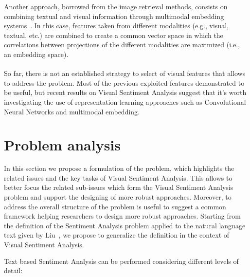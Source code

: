 Another approach, borrowed from the image retrieval methods, consists on combining textual and visual information through multimodal embedding systems~\cite{katsurai2016image}. In this case, features taken from different modalities (e.g., visual, textual, etc.) are combined to create a common vector space in which the correlations between projections of the different modalities are maximized (i.e., an embedding space).
\\
\\
So far, there is not an established strategy to select of visual features that allows to  address the problem. Most of the previous exploited features demonstrated to be useful, but recent results on Visual Sentiment Analysis %
suggest that it's worth investigating the use of representation learning approaches such as Convolutional Neural Networks and multimodal embedding.


\section{Problem analysis}\label{problem}


In this section we propose a formulation of the problem, which highlights the related issues and the key tasks of Visual Sentiment Analysis. This allows to better focus the related sub-issues which form the Visual Sentiment Analysis problem and support the designing of more robust approaches. Moreover, to address the overall structure of the problem is useful to suggest a common framework helping researchers to design more robust approaches.
Starting from the definition of the Sentiment Analysis problem applied to the natural language text given by Liu~\cite{liu2012sentiment}, we propose to generalize the definition in the context of Visual Sentiment Analysis.  %

Text based Sentiment Analysis can be performed considering different levels of detail: 


